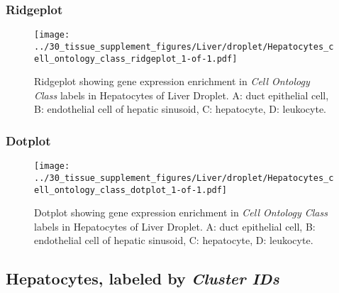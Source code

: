 \clearpage

\subsubsection{Ridgeplot}
\begin{figure}[h]
\centering
\texttt{[image: ../30\_tissue\_supplement\_figures/Liver/droplet/Hepatocytes\_cell\_ontology\_class\_ridgeplot\_1-of-1.pdf]}

\caption{ Ridgeplot  showing gene expression enrichment in \emph{Cell Ontology Class} labels in Hepatocytes of Liver Droplet. A: duct epithelial cell, B: endothelial cell of hepatic sinusoid, C: hepatocyte, D: leukocyte.}
\end{figure}


\clearpage

\subsubsection{Dotplot}
\begin{figure}[h]
\centering
\texttt{[image: ../30\_tissue\_supplement\_figures/Liver/droplet/Hepatocytes\_cell\_ontology\_class\_dotplot\_1-of-1.pdf]}

\caption{ Dotplot  showing gene expression enrichment in \emph{Cell Ontology Class} labels in Hepatocytes of Liver Droplet. A: duct epithelial cell, B: endothelial cell of hepatic sinusoid, C: hepatocyte, D: leukocyte.}
\end{figure}


\clearpage

\subsection{Hepatocytes, labeled by \emph{Cluster IDs}}
